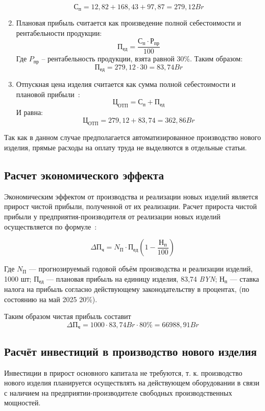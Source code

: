 \begin{enumerate}
$$С_п = 12,82 + 168,43 + 97,87 = 279,12 Br$$ 

\item Плановая прибыль считается как произведение полной себестоимости и рентабельности продукции:
  \begin{equation}
    П_{ед}= \frac{С_п \cdot Р_{пр}}{100}
  \end{equation}
  Где  $P_{пр}$ – рентабельность продукции, взята равной 30\%.
  Таким образом:
$$ П_{ед} = 279,12 \cdot 30 = 83,74 Br$$

\item Отпускная цена изделия считается как сумма полной себестоимости
  и плановой прибыли~\cite{bsuir-project-economics}:
  \begin{equation}
    Ц_{ОТП}=С_п+П_{ед}
  \end{equation}
  И равна: $$Ц_{ОТП}=279,12+83,74= 362,86 Br$$ 
\end{enumerate}

Так как в данном случае предполагается автоматизированное производство
нового изделия, прямые расходы на оплату труда не выделяются в
отдельные статьи.

\subsection{Расчет экономического эффекта}

Экономическим эффектом от производства и реализации новых изделий
является прирост чистой прибыли, полученной от их реализации.  Расчет
прироста чистой прибыли у предприятия-производителя от реализации
новых изделий осуществляется по
формуле~\cite{bsuir-project-economics}:

\begin{equation}
  \Delta П_ч=N_П \cdot П_{ед} ( 1- \frac{Н_п}{100} )
\end{equation}

Где $N_П$ — прогнозируемый годовой объём производства и реализации изделий, 1000 шт;
$П_{ед}$ — плановая прибыль на единицу изделия, 83,74 \textit{BYN};
$Н_п$ — ставка налога на прибыль согласно действующему законодательству в процентах,
(по состоянию на май 2025 20\%).

Таким образом чистая прибыль составит
$$  \Delta П_ч = 1000 \cdot 83,74Br \cdot 80\% = 66 988,91Br$$


\subsection{Расчёт инвестиций в производство нового изделия}
Инвестиции в прирост основного капитала не требуются,
т. к. производство нового изделия планируется осуществлять на
действующем оборудовании в связи с наличием на
предприятии-производителе свободных производственных мощностей.

